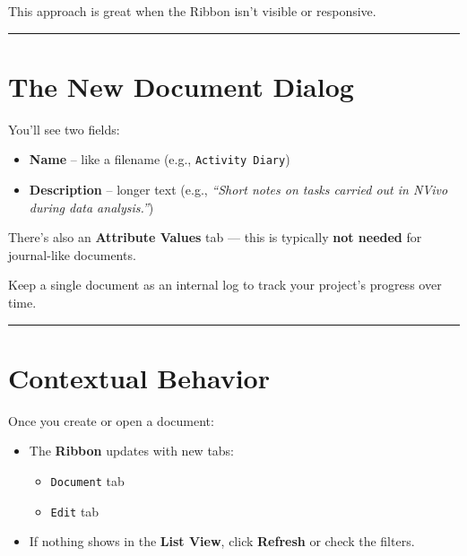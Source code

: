 \documentclass[
  letterpaper,
  DIV=11,
  numbers=noendperiod]{scrreprt}
\providecommand{\tightlist}{%
  \setlength{\itemsep}{0pt}\setlength{\parskip}{0pt}}\usepackage{longtable,booktabs,array}
\begin{document}
This approach is great when the Ribbon isn't visible or responsive.

\begin{center}\rule{0.5\linewidth}{0.5pt}\end{center}

\section{The New Document Dialog}\label{the-new-document-dialog}

You'll see two fields:

\begin{itemize}
\tightlist
\item
  \textbf{Name} -- like a filename (e.g., \texttt{Activity\ Diary})
\item
  \textbf{Description} -- longer text (e.g., \emph{``Short notes on
  tasks carried out in NVivo during data analysis.''})
\end{itemize}

There's also an \textbf{Attribute Values} tab --- this is typically
\textbf{not needed} for journal-like documents.

\begin{tcolorbox}[enhanced jigsaw, breakable, left=2mm, colback=white, bottomrule=.15mm, colbacktitle=quarto-callout-tip-color!10!white, leftrule=.75mm, title=\textcolor{quarto-callout-tip-color}{\faLightbulb}\hspace{0.5em}{Tip}, colframe=quarto-callout-tip-color-frame, coltitle=black, toptitle=1mm, opacitybacktitle=0.6, toprule=.15mm, titlerule=0mm, bottomtitle=1mm, arc=.35mm, rightrule=.15mm, opacityback=0]

Keep a single document as an internal log to track your project's
progress over time.

\end{tcolorbox}

\begin{center}\rule{0.5\linewidth}{0.5pt}\end{center}

\section{Contextual Behavior}\label{contextual-behavior}

Once you create or open a document:

\begin{itemize}
\tightlist
\item
  The \textbf{Ribbon} updates with new tabs:

  \begin{itemize}
  \tightlist
  \item
    \texttt{Document} tab
  \item
    \texttt{Edit} tab
  \end{itemize}
\item
  If nothing shows in the \textbf{List View}, click \textbf{Refresh} or
  check the filters.
\end{itemize}
\end{document}
